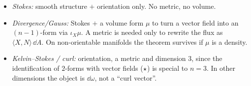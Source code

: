 \begin{remark}\label{rem:whatneeds}
\begin{itemize}
\item \emph{Stokes:} smooth structure $+$ orientation only. No metric, no volume.
\item \emph{Divergence/Gauss:} Stokes $+$ a volume form $\mu$ to turn a vector field into an $(n-1)$-form via $\iota_X\mu$. A metric is needed only to rewrite the flux as $\langle X,N\rangle\,\dd A$. On non-orientable manifolds the theorem survives if $\mu$ is a density.
\item \emph{Kelvin--Stokes / curl:} orientation, a metric and dimension $3$, since the identification of $2$-forms with vector fields ($\star$) is special to $n=3$. In other dimensions the object is $\dd\omega$, not a ``curl vector''.
\end{itemize}
\end{remark}
